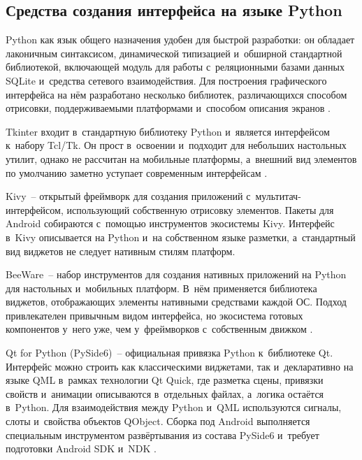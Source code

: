 \documentclass[14pt,a4paper]{extarticle}
\begin{document}
\subsection{Средства создания интерфейса на языке Python}

Python как язык общего назначения удобен для быстрой разработки: он обладает лаконичным синтаксисом, динамической типизацией и~обширной стандартной библиотекой, включающей модуль для работы с~реляционными базами данных SQLite и~средства сетевого взаимодействия. Для построения графического интерфейса на нём разработано несколько библиотек, различающихся способом отрисовки, поддерживаемыми платформами и~способом описания экранов \cite{b7,b11}.



Tkinter входит в~стандартную библиотеку Python и~является интерфейсом к~набору Tcl/Tk. Он прост в~освоении и~подходит для небольших настольных утилит, однако не рассчитан на мобильные платформы, а~внешний вид элементов по умолчанию заметно уступает современным интерфейсам \cite{b7}.



Kivy~– открытый фреймворк для создания приложений с~мультитач-интерфейсом, использующий собственную отрисовку элементов. Пакеты для Android собираются с~помощью инструментов экосистемы Kivy. Интерфейс в~Kivy описывается на Python и~на собственном языке разметки, а~стандартный вид виджетов не следует нативным стилям платформ.



BeeWare~– набор инструментов для создания нативных приложений на Python для настольных и~мобильных платформ. В~нём применяется библиотека виджетов, отображающих элементы нативными средствами каждой ОС. Подход привлекателен привычным видом интерфейса, но экосистема готовых компонентов у~него уже, чем у~фреймворков с~собственным движком \cite{b2}.



Qt for Python (PySide6)~– официальная привязка Python к~библиотеке Qt. Интерфейс можно строить как классическими виджетами, так и~декларативно на языке QML в~рамках технологии Qt Quick, где разметка сцены, привязки свойств и~анимации описываются в~отдельных файлах, а~логика остаётся в~Python. Для взаимодействия между Python и~QML используются сигналы, слоты и~свойства объектов QObject. Сборка под Android выполняется специальным инструментом развёртывания из состава PySide6 и~требует подготовки Android SDK и~NDK \cite{b8}.
\end{document}
